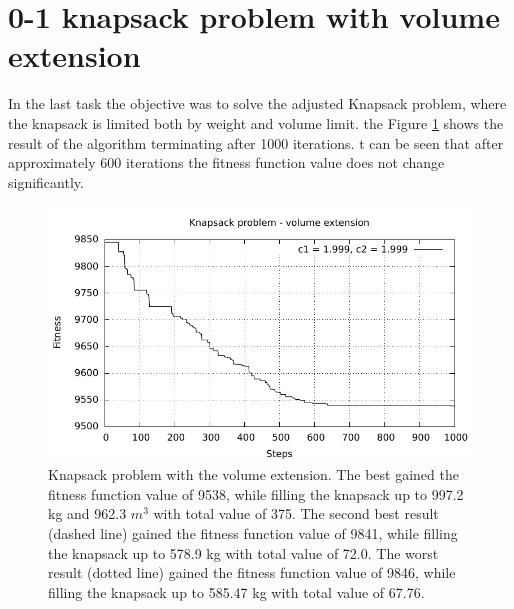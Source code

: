 \section{0-1 knapsack problem with volume extension}
In the last task the objective was to solve the adjusted Knapsack problem, where the knapsack is limited both by weight and volume limit. the Figure \ref{fig:knaspack_volume} shows the result of the algorithm terminating after 1000 iterations. t can be seen that after approximately 600 iterations the fitness function value does not change significantly.

\begin{figure}[!h]
	\centering
		\includegraphics[width=15cm]{img/4a.pdf}
	\caption{Knapsack problem with the volume extension. The best gained the fitness function value of 9538, while filling the knapsack up to 997.2 kg and 962.3 $m^{3}$ with total value of 375. The second best result (dashed line) gained the fitness function value of 9841, while filling the knapsack up to 578.9 kg with total value of 72.0. The worst result (dotted line) gained the fitness function value of 9846, while filling the knapsack up to 585.47 kg with total value of 67.76.}
	\label{fig:knaspack_volume}
\end{figure}
